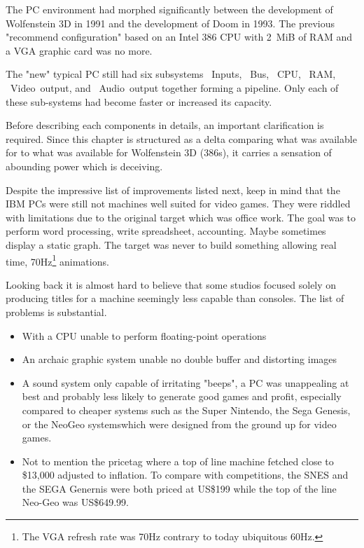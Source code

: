 The PC environment had morphed significantly between the development of Wolfenstein 3D in 1991 and the development of Doom in 1993. The previous "recommend configuration" based on an Intel 386 CPU with 2~MiB of RAM and a VGA graphic card was no more.\\
\par
The "new" typical PC still had six subsystems ~Inputs, ~Bus, ~CPU, ~RAM, ~Video~output, and ~Audio~output together forming a pipeline. Only each of these sub-systems had become faster or increased its capacity.\\
\par
\vspace{2mm}
\par
 Before describing each components in details, an important clarification is required. Since this chapter is structured as a delta comparing what was available for \doom to what was available for Wolfenstein 3D (386s), it carries a sensation of abounding power which is deceiving. \\
 \par
 Despite the impressive list of improvements listed next, keep in mind that the IBM PCs were still not machines well suited for video games. They were riddled with limitations due to the original target which was office work. The goal was to perform word processing, write spreadsheet, accounting. Maybe sometimes display a static graph. The target was never to build something allowing real time, 70Hz\footnote{The VGA refresh rate was 70Hz contrary to today ubiquitous 60Hz.} animations.\\ 
\par 
Looking back it is almost hard to believe that some studios focused solely on producing titles for a machine seemingly less capable than consoles. The list of problems is substantial.
\begin{itemize}
\item With a CPU unable to perform floating-point operations
\item An archaic graphic system unable no double buffer and distorting images
\item A sound system only capable of irritating "beeps", a PC was unappealing at best and probably less likely to generate good games and profit, especially compared to cheaper systems such as the Super Nintendo, the Sega Genesis, or the NeoGeo systemswhich were designed from the ground up for video games.
\item Not to mention the pricetag where a top of line machine fetched close to \$13,000 adjusted to inflation. To compare with competitions, the SNES and the SEGA Genernis were both priced at US\$199 while the top of the line Neo-Geo was US\$649.99.
\end{itemize}

